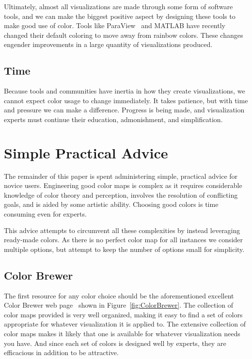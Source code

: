 \documentclass[letterpaper,twocolumn,fleqn]{article}
\newcommand*{\lcite}[1]{~\cite{#1}}
\begin{document}
Ultimately, almost all visualizations are made through some form of
software tools, and we can make the biggest positive aspect by designing
these tools to make good use of color. Tools like ParaView\lcite{ParaView}
and MATLAB have recently changed their default coloring to move away from
rainbow colors. These changes engender improvements in a large quantity of
visualizations produced.

\subsection{Time}

\noindent
Because tools and communities have inertia in how they create
visualizations, we cannot expect color usage to change immediately. It
takes patience, but with time and pressure we can make a difference.
Progress is being made, and visualization experts must continue their
education, admonishment, and simplification.


\section{Simple Practical Advice}

The remainder of this paper is spent administering simple, practical advice
for novice users. Engineering good color maps is complex as it requires
considerable knowledge of color theory and perception, involves the
resolution of conflicting goals, and is aided by some artistic ability.
Choosing good colors is time consuming even for experts.

This advice attempts to circumvent all these complexities by instead
leveraging ready-made colors. As there is no perfect color map for all
instances we consider multiple options, but attempt to keep the number of
options small for simplicity.

\subsection{Color Brewer}

\noindent
The first resource for any color choice should be the aforementioned
excellent Color Brewer web page\lcite{ColorBrewerURL} shown in
Figure~\ref{fig:ColorBrewer}. The collection of color maps provided is very
well organized, making it easy to find a set of colors appropriate for
whatever visualization it is applied to. The extensive collection of color
maps makes it likely that one is available for whatever visualization needs
you have. And since each set of colors is designed well by experts, they
are efficacious in addition to be attractive.
\end{document}
